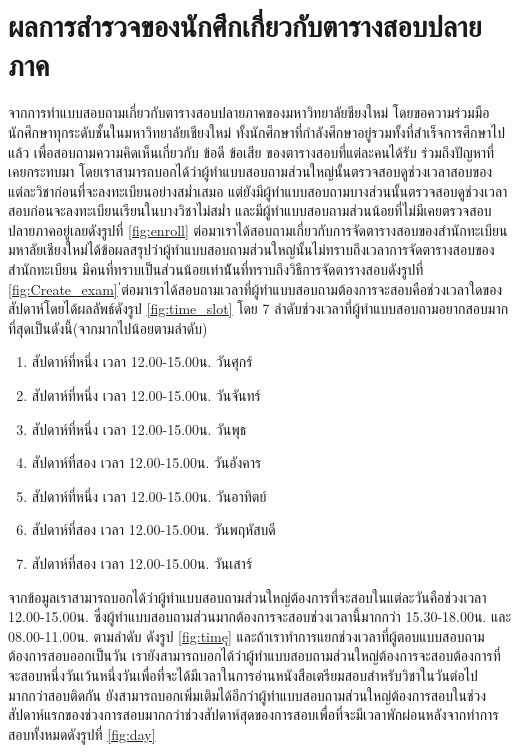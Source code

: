 \section{ผลการสำรวจของนักศึกเกี่ยวกับตารางสอบปลายภาค}
จากการทำแบบสอบถามเกี่ยวกับตารางสอบปลายภาคของมหาวิทยาลัยชียงใหม่ โดยขอความร่วมมือนักศึกษาทุกระดับชั้นในมหาวิทยาลัยเชียงใหม่ 
ทั้งนักศึกษาที่กำลังศึกษาอยู่รวมทั้งที่สำเร็จการศึกษาไปแล้ว เพื่อสอบถามความคิดเห็นเกี่ยวกับ ข้อดี ข้อเสีย ของตารางสอบที่แต่ละคนได้รับ 
ร่วมถึงปัญหาที่เคยกระทบมา โดยเราสามารถบอกได้ว่าผู้ทำแบบสอบถามส่วนใหญ่นั้นตรวจสอบดูช่วงเวลาสอบของแต่ละวิชาก่อนที่จะลงทะเบียนอย่างสม่ำเสมอ 
แต่ยังมีผู้ทำแบบสอบถามบางส่วนนั้นตรวจสอบดูช่วงเวลาสอบก่อนจะลงทะเบียนเรียนในบางวิชาไม่สม่ำ และมีผู้ทำแบบสอบถามส่วนน้อยที่ไม่มีเคยตรวจสอบปลายภาคอยู่เลยดังรูปที่ \ref{fig:enroll}
ต่อมาเราได้สอบถามเกี่ยวกับการจัดตารางสอบของสำนักทะเบียนมหาลัยเชียงใหม่ได้ข้อผลสรุปว่าผู้ทำแบบสอบถามส่วนใหญ่นั้นไม่ทราบถึงเวลาการจัดตารางสอบของสำนักทะเบียน มีคนที่ทราบเป็นส่วนน้อยเท่าน้ันที่ทราบถึงวิธีการจัดตารางสอบดังรูปที่ \ref{fig:Create_exam} 
่ต่อมาเราได้สอบถามเวลาที่ผู้ทำแบบสอบถามต้องการจะสอบคือช่วงเวลาใดของสัปดาห์โดยได้ผลลัพธ์ดังรูป \ref{fig:time_slot} โดย 7 ลำดับช่วงเวลาที่ผู้ทำแบบสอบถามอยากสอบมากที่สุดเป็นดังนี้(จากมากไปน้อยตามลำดับ)
\begin{enumerate}
  \item สัปดาห์ที่หนึ่ง เวลา 12.00-15.00น. วันศุกร์ 
  \item สัปดาห์ที่หนึ่ง เวลา 12.00-15.00น. วันจันทร์
  \item สัปดาห์ที่หนึ่ง เวลา 12.00-15.00น. วันพุธ
  \item สัปดาห์ที่สอง เวลา 12.00-15.00น. วันอังคาร
  \item สัปดาห์ที่หนึ่ง เวลา 12.00-15.00น. วันอาทิตย์
  \item สัปดาห์ที่สอง เวลา 12.00-15.00น. วันพฤหัสบดี
  \item สัปดาห์ที่สอง เวลา 12.00-15.00น. วันเสาร์
\end{enumerate}

จากข้อมูลเราสามารถบอกได้ว่าผู้ทำแบบสอบถามส่วนใหญ่ต้องการที่จะสอบในแต่ละวันคือช่วงเวลา 12.00-15.00น. ซึ่งผู้ทำแบบสอบถามส่วนมากต้องการจะสอบช่วงเวลานี้มากกว่า 15.30-18.00น. และ 08.00-11.00น. ตามลำดับ ดังรูป \ref{fig:timeุ} และถ้าเราทำการแยกช่วงเวลาที่ผู้ตอบแบบสอบถามต้องการสอบออกเป็นวัน เรายังสามารถบอกได้ว่าผู้ทำแบบสอบถามส่วนใหญ่ต้องการจะสอบต้องการที่จะสอบหนึ่งวันเว้นหนึ่งวันเพื่อที่จะได้มีเวลาในการอ่านหนังสือเตรียมสอบสำหรับวิชาในวันต่อไปมากกว่าสอบติดกัน 
ยังสามารถบอกเพิ่มเติมได้อีกว่าผู้ทำแบบสอบถามส่วนใหญ่ต้องการสอบในช่วงสัปดาห์แรกของช่วงการสอบมากกว่าช่วงสัปดาห์สุดของการสอบเพื่อที่จะมีเวลาพักผ่อนหลังจากทำการสอบทั้งหมดดังรูปที่ \ref{fig:day}

